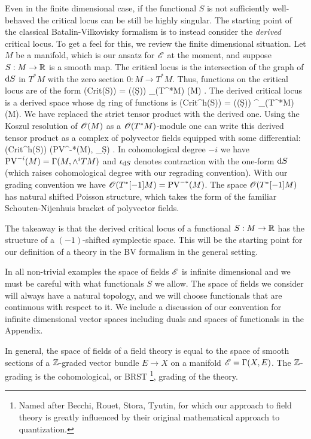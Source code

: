 \documentclass[11pt]{amsart}
\begin{document}
Even in the finite dimensional case, if the functional $S$ is not sufficiently well-behaved the critical locus can be still be highly singular. 
The starting point of the classical Batalin-Vilkovisky formalism is to instead consider the {\em derived} critical locus.
To get a feel for this, we review the finite dimensional situation.
Let $M$ be a manifold, which is our ansatz for $\mathscr E$ at the moment, and suppose $S : M \to \mathbb R$ is a smooth map.
The critical locus is the intersection of the graph of ${\rm d} S$ in $T^*M$ with the zero section $0 : M \to T^*M$.
Thus, functions on the critical locus are of the form
\ben
\sO({\rm Crit}(S)) = \sO(\Gamma(\d S)) \tensor_{\sO(T^*M)} \sO(M) .
\een
The derived critical locus is a derived space whose dg ring of functions is 
\ben
\sO({\rm Crit}^{h}(S)) = \sO(\Gamma(\d S)) \tensor^{\LL}_{\sO(T^*M)} \sO(M).
\een
We have replaced the strict tensor product with the derived one.
Using the Koszul resolution of $\mathscr O(M)$ as a $\mathscr O(T^*M)$-module one can write this derived tensor product as a complex of polyvector fields equipped with some differential:
\ben
\sO({\rm Crit}^h(S)) \simeq \left({\rm PV}^{-*}(M), \iota_{\d S}\right) .
\een
In cohomological degree $-i$ we have ${\rm PV}^{-i} (M) = \Gamma(M, \wedge^i TM)$ and $\iota_{{\rm d} S}$ denotes contraction with the one-form ${\rm d} S$ (which raises cohomological degree with our regrading convention).
With our grading convention we have $\mathscr O(T^*[-1] M) = {\rm PV}^{-*}(M)$. 
The space $\mathscr O(T^*[-1]M)$ has natural shifted Poisson structure, which takes the form of the familiar Schouten-Nijenhuis bracket of polyvector fields.

The takeaway is that the derived critical locus of a functional $S : M \to \mathbb R$ has the structure of a $(-1)$-shifted symplectic space.
This will be the starting point for our definition of a theory in the BV formalism in the general setting.
 
In all non-trivial examples the space of fields $\mathscr E$ is infinite dimensional and we must be careful with what functionals $S$ we allow.
The space of fields we consider will always have a natural topology, and we will choose functionals that are continuous with respect to it. 
We include a discussion of our convention for infinite dimensional vector spaces including duals and spaces of functionals in the Appendix. 

In general, the space of fields of a field theory is equal to the space of smooth sections of a $\mathbb Z$-graded vector bundle $E \to X$ on a manifold $\mathscr E = \Gamma(X, E)$. 
The $\mathbb Z$-grading is the cohomological, or BRST \footnote{Named after Becchi, Rouet, Stora, Tyutin, for which our approach to field theory is greatly influenced by their original mathematical approach to quantization.}, grading of the theory.
\end{document}
